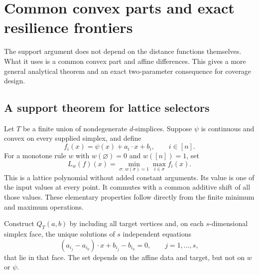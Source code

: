 \section{Common convex parts and exact resilience frontiers}
\label{sec:power-frontier}
The support argument does not depend on the distance functions themselves. What it uses is a common convex part and affine differences. This gives a more general analytical theorem and an exact two-parameter consequence for coverage design.

\subsection{A support theorem for lattice selectors}
Let $T$ be a finite union of nondegenerate $d$-simplices. Suppose $\psi$ is continuous and convex on every supplied simplex, and define
\begin{equation}\label{eq:common-convex}
f_i(x)=\psi(x)+a_i\cdot x+b_i,\qquad i\in[n].
\end{equation}
For a monotone rule $w$ with $w(\varnothing)=0$ and $w([n])=1$, set
\begin{equation}\label{eq:lattice-selector}
L_w(f)(x)=\min_{\sigma:\,w(\sigma)=1}\max_{i\in\sigma}f_i(x).
\end{equation}
This is a lattice polynomial without added constant arguments. Its value is one of the input values at every point. It commutes with a common additive shift of all those values. These elementary properties follow directly from the finite minimum and maximum operations.

Construct $Q_T(a,b)$ by including all target vertices and, on each $s$-dimensional simplex face, the unique solutions of $s$ independent equations
\begin{equation}\label{eq:affine-ties}
(a_{i_j}-a_{i_0})\cdot x+b_{i_j}-b_{i_0}=0,
\qquad j=1,\ldots,s,
\end{equation}
that lie in that face. The set depends on the affine data and target, but not on $w$ or $\psi$.


